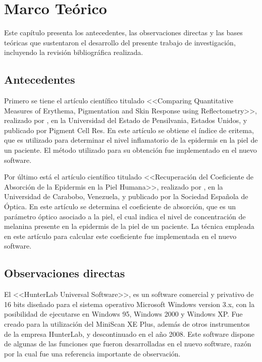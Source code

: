 \chapter{Marco Te\'{o}rico}

Este cap\'{i}tulo presenta los antecedentes, las observaciones directas y las bases te\'{o}ricas que sustentaron el desarrollo del presente trabajo de investigaci\'{o}n, incluyendo la revisi\'{o}n bibliogr\'{a}fica realizada.

	\section{Antecedentes}	
			
			Primero se tiene el art\'{i}culo cient\'{i}fico titulado <<Comparing Quantitative Measures of Erythema, Pigmentation and Skin Response using Reflectometry>>, realizado por \cite{Wagner}, en la Universidad del Estado de Pensilvania, Estados Unidos, y publicado por Pigment Cell Res. En este art\'{i}culo se obtiene el \'{i}ndice de eritema, que es utilizado para determinar el nivel inflamatorio de la epidermis en la piel de un paciente. El m\'{e}todo utilizado para su obtenci\'{o}n fue implementado en el nuevo software.
			
			Por	\'{u}ltimo est\'{a} el art\'{i}culo cient\'{i}fico titulado <<Recuperaci\'{o}n del Coeficiente de Absorci\'{o}n de la Epidermis en la Piel Humana>>, realizado por \cite{Narea}, en la Universidad de Carabobo, Venezuela, y publicado por la Sociedad Espa\~{n}ola de \'{O}ptica. En este art\'{i}culo se determina el coeficiente de absorci\'{o}n, que es un par\'{a}metro \'{o}ptico asociado a la piel, el cual indica el nivel de concentraci\'{o}n de melanina presente en la epidermis de la piel de un paciente. La t\'{e}cnica empleada en este art\'{i}culo para calcular este coeficiente fue implementada en el nuevo software.

	\section{Observaciones directas}
		
			El <<HunterLab Universal Software>>, es un software comercial y privativo de 16 bits dise\~{n}ado para el sistema operativo Microsoft Windows version 3.x, con la posibilidad de ejecutarse en Windows 95, Windows 2000 y Windows XP. Fue creado para la utilizaci\'{o}n del MiniScan XE Plus, adem\'{a}s de otros instrumentos de la empresa HunterLab, y descontinuado en el a\~{n}o 2008. Este software dispone de algunas de las funciones que fueron desarrolladas en el nuevo software, raz\'{o}n por la cual fue una referencia importante de observaci\'{o}n.

